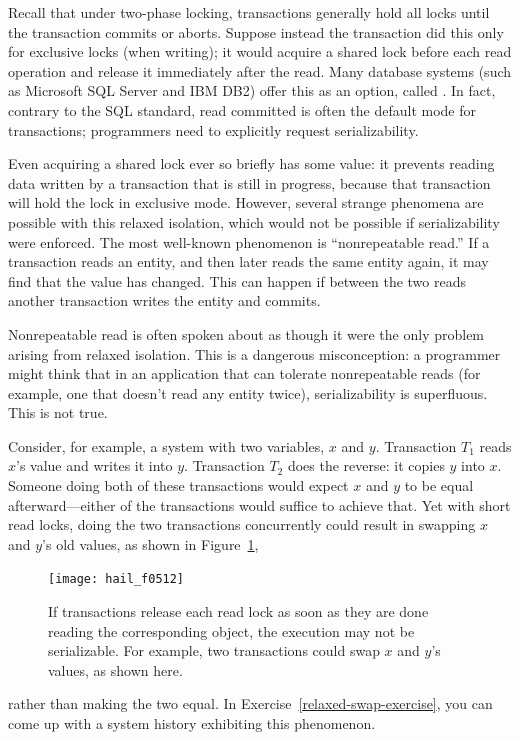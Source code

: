 Recall that under two-phase locking, transactions generally hold all
locks until the transaction commits or aborts.  Suppose instead the
transaction did this only for exclusive locks (when writing); it would
acquire a shared lock before each read operation and release it
immediately after the read.  Many database systems (such as Microsoft
SQL Server and IBM DB2) offer this as an option, called
.  In fact, contrary to the SQL standard,
read committed is often the default mode for transactions; programmers
need to explicitly request serializability.

Even acquiring a shared lock ever so briefly has some value: it
prevents reading data written by a transaction that is still in
progress, because that transaction will hold the lock in exclusive mode.
However, several strange phenomena are possible with this relaxed
isolation, which would not be possible if serializability were
enforced.  The most well-known phenomenon is ``nonrepeatable read.''
If a transaction reads an entity, and then later reads the same entity
again, it may find that the value has changed.  This can happen if
between the two reads another transaction writes the entity and
commits.

Nonrepeatable read is often spoken about as though it were the only
problem arising from relaxed isolation.  This is a dangerous
misconception: a programmer might think that in an application that
can tolerate nonrepeatable reads (for example, one that doesn't read any
entity twice), serializability is superfluous.  This is not true.

Consider, for example, a system with two variables, $x$ and $y$.
Transaction $T_1$ reads $x$'s value and writes it into $y$.
Transaction $T_2$ does the reverse: it copies $y$ into $x$.
Someone doing both of these transactions would expect $x$ and $y$ to
be equal afterward---either of the transactions would suffice to achieve that.
Yet with short read locks, doing the two transactions concurrently
could result in swapping $x$ and $y$'s old values, as shown in
Figure~\ref{scan-5-12},
\begin{figure}
\centerline{\texttt{[image: hail\_f0512]}}
\caption{If transactions release each read lock as soon as they are
  done reading the corresponding object, the execution may not be
  serializable.  For example, two transactions could swap $x$ and
  $y$'s values, as shown here.}
\label{scan-5-12}
\end{figure}
rather than making
the two equal.  In Exercise~\ref{relaxed-swap-exercise}, you can come up with a system history
exhibiting this phenomenon.

